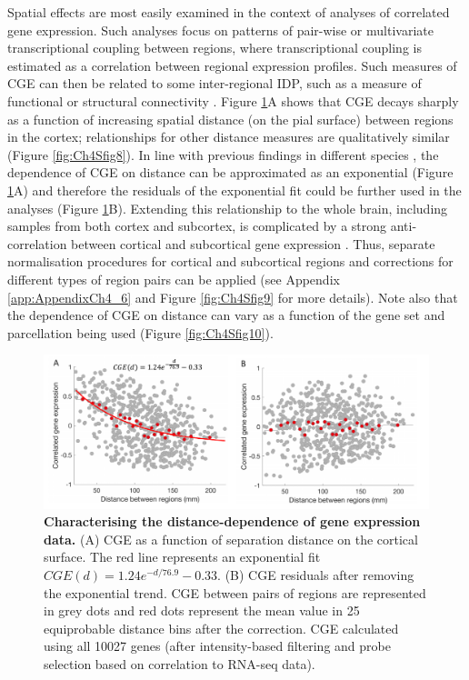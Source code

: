 Spatial effects are most easily examined in the context of analyses of correlated gene expression. Such analyses focus on patterns of pair-wise or multivariate transcriptional coupling between regions, where transcriptional coupling is estimated as a correlation between regional expression profiles. Such measures of CGE can then be related to some inter-regional IDP, such as a measure of functional or structural connectivity \citep{Richiardi2015,Fulcher2016,Arnatkeviciute2018}. Figure \ref{fig:Ch4Fig8}A shows that CGE decays sharply as a function of increasing spatial distance (on the pial surface) between regions in the cortex; relationships for other distance measures are qualitatively similar (Figure \ref{fig:Ch4Sfig8}). In line with previous findings in different species \mbox{\citep{Fulcher2016,Arnatkeviciute2018}}, the dependence of CGE on distance can be approximated as an exponential (Figure \ref{fig:Ch4Fig8}A) and therefore the residuals of the exponential fit could be further used in the analyses (Figure \ref{fig:Ch4Fig8}B). Extending this relationship to the whole brain, including samples from both cortex and subcortex, is complicated by a strong anti-correlation between cortical and subcortical gene expression \citep{Hawrylycz2015}. Thus, separate normalisation procedures for cortical and subcortical regions and corrections for different types of region pairs can be applied (see Appendix \ref{app:AppendixCh4_6} and Figure \ref{fig:Ch4Sfig9} for more details). Note also that the dependence of CGE on distance can vary as a function of the gene set and parcellation being used (Figure \ref{fig:Ch4Sfig10}).

\begin{figure}[h]
  \centering
    \includegraphics[width=1\textwidth]{Chapter4/Ch4Fig8.pdf}
\caption{\textbf{Characterising the distance-dependence of gene expression data.} (A) CGE as a function of separation distance on the cortical surface. The red line represents an exponential fit \mbox{$CGE(d) = 1.24e^{-d/76.9}-0.33$}.
(B) CGE residuals after removing the exponential trend. CGE between pairs of regions are represented in grey dots and red dots represent the mean value in 25 equiprobable distance bins after the correction. CGE calculated using all \num{10027} genes (after intensity-based filtering and probe selection based on correlation to RNA-seq data).}
\label{fig:Ch4Fig8}
\end{figure}

